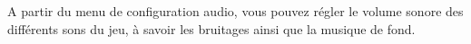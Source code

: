 A partir du menu de configuration audio, vous pouvez régler le volume sonore des différents sons du jeu, à savoir les bruitages ainsi que la musique de fond.